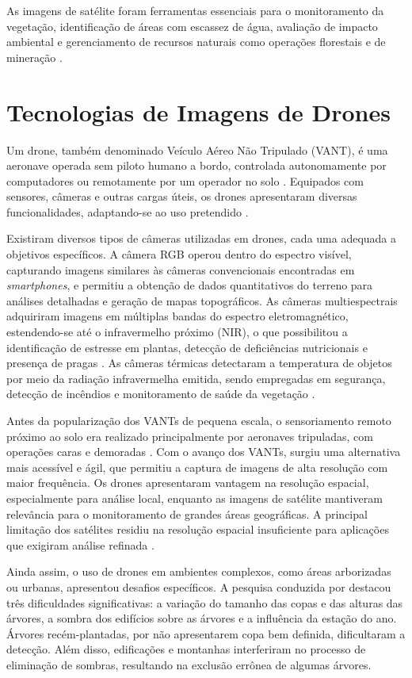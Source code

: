 \documentclass[
    12pt,
    openright,
    oneside,
    a4paper,
    sumario=tradicional,
    english,
    brazil,
    ]{abntex2}
\begin{document}
As imagens de satélite foram ferramentas essenciais para o monitoramento da vegetação, identificação de áreas com escassez de água, avaliação de impacto ambiental e gerenciamento de recursos naturais como operações florestais e de mineração \cite{geoinova2024, wu2024fine}.

\section{Tecnologias de Imagens de Drones}

Um drone, também denominado Veículo Aéreo Não Tripulado (VANT), é uma aeronave operada sem piloto humano a bordo, controlada autonomamente por computadores ou remotamente por um operador no solo \cite{Phang2023}. Equipados com sensores, câmeras e outras cargas úteis, os drones apresentaram diversas funcionalidades, adaptando-se ao uso pretendido \cite{drones8040127}.

Existiram diversos tipos de câmeras utilizadas em drones, cada uma adequada a objetivos específicos. A câmera RGB operou dentro do espectro visível, capturando imagens similares às câmeras convencionais encontradas em \textit{smartphones}, e permitiu a obtenção de dados quantitativos do terreno para análises detalhadas e geração de mapas topográficos. As câmeras multiespectrais adquiriram imagens em múltiplas bandas do espectro eletromagnético, estendendo-se até o infravermelho próximo (NIR), o que possibilitou a identificação de estresse em plantas, detecção de deficiências nutricionais e presença de pragas \cite{droneng2024}. As câmeras térmicas detectaram a temperatura de objetos por meio da radiação infravermelha emitida, sendo empregadas em segurança, detecção de incêndios e monitoramento de saúde da vegetação \cite{aeon2024, cnptia2024}.

Antes da popularização dos VANTs de pequena escala, o sensoriamento remoto próximo ao solo era realizado principalmente por aeronaves tripuladas, com operações caras e demoradas \cite{Phang2023}. Com o avanço dos VANTs, surgiu uma alternativa mais acessível e ágil, que permitiu a captura de imagens de alta resolução com maior frequência. Os drones apresentaram vantagem na resolução espacial, especialmente para análise local, enquanto as imagens de satélite mantiveram relevância para o monitoramento de grandes áreas geográficas. A principal limitação dos satélites residiu na resolução espacial insuficiente para aplicações que exigiram análise refinada \cite{Phang2023}.

Ainda assim, o uso de drones em ambientes complexos, como áreas arborizadas ou urbanas, apresentou desafios específicos. A pesquisa conduzida por \textcite{neto2012detecccao} destacou três dificuldades significativas: a variação do tamanho das copas e das alturas das árvores, a sombra dos edifícios sobre as árvores e a influência da estação do ano. Árvores recém-plantadas, por não apresentarem copa bem definida, dificultaram a detecção. Além disso, edificações e montanhas interferiram no processo de eliminação de sombras, resultando na exclusão errônea de algumas árvores.
\end{document}
